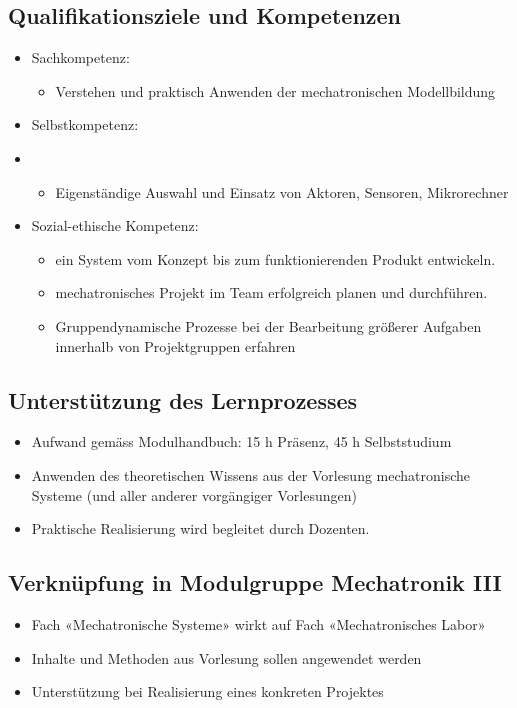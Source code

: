 \subsection*{Qualifikationsziele und Kompetenzen}
\begin{itemize}
    \item Sachkompetenz:
    \begin{itemize}
        \item Verstehen und praktisch Anwenden der mechatronischen Modellbildung
    \end{itemize}
    \item Selbstkompetenz:
    \item \begin{itemize}
        \item Eigenständige Auswahl und Einsatz von Aktoren, Sensoren, Mikrorechner
    \end{itemize}
    \item Sozial-ethische Kompetenz:
    \begin{itemize}
        \item ein System vom Konzept bis zum funktionierenden Produkt entwickeln.
        \item mechatronisches Projekt im Team erfolgreich planen und durchführen.
        \item Gruppendynamische Prozesse bei der Bearbeitung größerer Aufgaben innerhalb von Projektgruppen erfahren
    \end{itemize}
\end{itemize}

\subsection*{Unterstützung des Lernprozesses}
\begin{itemize}
    \item Aufwand gemäss Modulhandbuch: 15 h Präsenz, 45 h Selbststudium
    \item Anwenden des theoretischen Wissens aus der Vorlesung mechatronische Systeme (und aller anderer vorgängiger Vorlesungen)
    \item Praktische Realisierung wird begleitet durch Dozenten.    
\end{itemize}

\subsection*{Verknüpfung in Modulgruppe Mechatronik III}
\begin{itemize}
    \item Fach «Mechatronische Systeme» wirkt auf Fach «Mechatronisches Labor»
    \item Inhalte und Methoden aus Vorlesung sollen angewendet werden
    \item Unterstützung bei Realisierung eines konkreten Projektes
\end{itemize}

